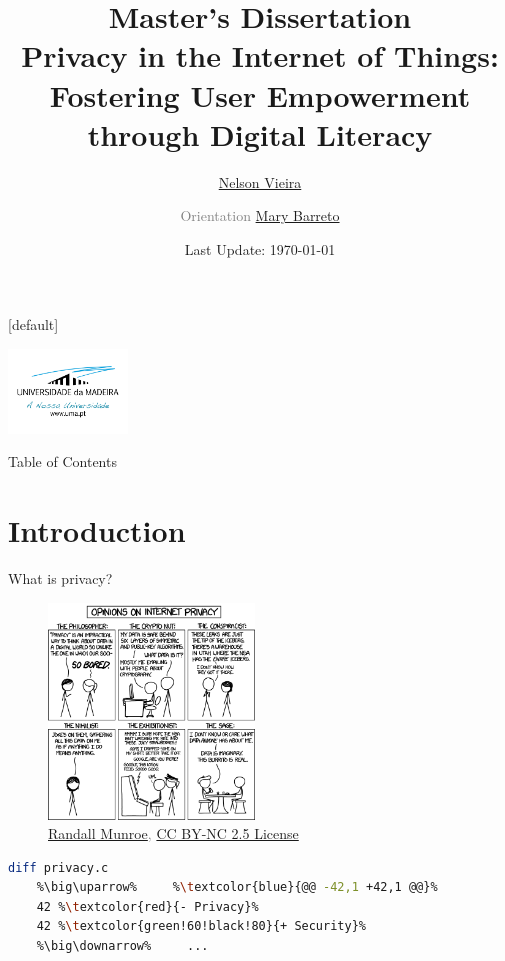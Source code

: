 \documentclass[xcolor={svgnames},compress,aspectratio=169]{beamer}
\title[Privacy in the Internet of Things: Fostering User Empowerment through Digital Literacy]{Master's Dissertation \\ {\normalsize Privacy in the Internet of Things: Fostering User Empowerment through Digital Literacy}}
\author{\href{mailto:2080511@student.uma.pt}{Nelson Vieira}
\\ \and \textcolor{gray}{Orientation} \href{mailto:mary.barreto@staff.uma.pt}{Mary Barreto}
}
\institute[\href{https://www.uma.pt/}{University of Madeira}]{University of Madeira\\Faculty of Exact Sciences and Engineering}
\date{{\scriptsize Last Update: \today}}
\makeatletter
\newenvironment{withoutheadline}{
        \setbeamertemplate{headline}[default]
        \def\beamer@entrycode{\vspace*{-\headheight}}
    }{}
\makeatother
\begin{document}
\begin{withoutheadline}
    \begin{frame}
        \centering\includegraphics[width=90pt]{../thesis/assets/images/uma_logo.png}
        \maketitle
    \end{frame}
\end{withoutheadline}

\begin{frame}{Table of Contents}
    \begin{multicols}{2}
        \tableofcontents
    \end{multicols}
\end{frame}

\section{Introduction}

\begin{frame}[fragile]
    \begin{multicols}{2}
        \centering
        {\footnotesize What is privacy?}
        \begin{figure}
            \centering\includegraphics[width=155pt]{assets/images/privacy_opinions.png}\\
            \textcolor{gray}{{\tiny \textcopyright \href{https://xkcd.com/1269/}{Randall Munroe}, \href{https://creativecommons.org/licenses/by-nc/2.5/}{CC BY-NC 2.5 License}}}
        \end{figure}

        \columnbreak
        \vspace*{\fill}
\begin{lstlisting}[language=sh,escapechar=\%]
    diff privacy.c
    %\big\uparrow%     %\textcolor{blue}{@@ -42,1 +42,1 @@}%
    42 %\textcolor{red}{- Privacy}%
    42 %\textcolor{green!60!black!80}{+ Security}%
    %\big\downarrow%     ...
\end{lstlisting}
        \vspace*{\fill}
    \end{multicols}
\end{frame}
\end{document}

